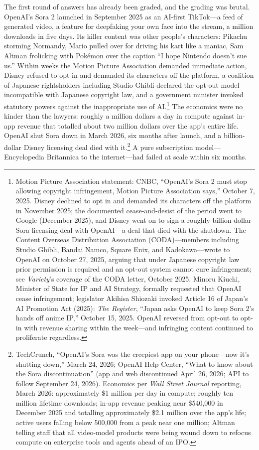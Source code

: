 The first round of answers has already been graded, and the grading was brutal. OpenAI's Sora 2 launched in September 2025 as an AI-first TikTok---a feed of generated video, a feature for deepfaking your own face into the stream, a million downloads in five days. Its killer content was other people's characters: Pikachu storming Normandy, Mario pulled over for driving his kart like a maniac, Sam Altman frolicking with Pok\'emon over the caption ``I hope Nintendo doesn't sue us.'' Within weeks the Motion Picture Association demanded immediate action, Disney refused to opt in and demanded its characters off the platform, a coalition of Japanese rightsholders including Studio Ghibli declared the opt-out model incompatible with Japanese copyright law, and a government minister invoked statutory powers against the inappropriate use of AI.\footnote{Motion Picture Association statement: CNBC, ``OpenAI's Sora 2 must stop allowing copyright infringement, Motion Picture Association says,'' October 7, 2025. Disney declined to opt in and demanded its characters off the platform in November 2025; the documented cease-and-desist of the period went to Google (December 2025), and Disney went on to sign a roughly billion-dollar Sora licensing deal with OpenAI---a deal that died with the shutdown. The Content Overseas Distribution Association (CODA)---members including Studio Ghibli, Bandai Namco, Square Enix, and Kadokawa---wrote to OpenAI on October 27, 2025, arguing that under Japanese copyright law prior permission is required and an opt-out system cannot cure infringement; see \emph{Variety}'s coverage of the CODA letter, October 2025. Minoru Kiuchi, Minister of State for IP and AI Strategy, formally requested that OpenAI cease infringement; legislator Akihisa Shiozaki invoked Article 16 of Japan's AI Promotion Act (2025): \emph{The Register}, ``Japan asks OpenAI to keep Sora 2's hands off anime IP,'' October 15, 2025. OpenAI reversed from opt-out to opt-in with revenue sharing within the week---and infringing content continued to proliferate regardless.} The economics were no kinder than the lawyers: roughly a million dollars a day in compute against in-app revenue that totalled about two million dollars over the app's entire life. OpenAI shut Sora down in March 2026, six months after launch, and a billion-dollar Disney licensing deal died with it.\footnote{TechCrunch, ``OpenAI's Sora was the creepiest app on your phone---now it's shutting down,'' March 24, 2026; OpenAI Help Center, ``What to know about the Sora discontinuation'' (app and web discontinued April 26, 2026; API to follow September 24, 2026). Economics per \emph{Wall Street Journal} reporting, March 2026: approximately \$1 million per day in compute; roughly ten million lifetime downloads; in-app revenue peaking near \$540,000 in December 2025 and totalling approximately \$2.1 million over the app's life; active users falling below 500,000 from a peak near one million; Altman telling staff that all video-model products were being wound down to refocus compute on enterprise tools and agents ahead of an IPO.} A pure subscription model---Encyclopedia Britannica to the internet---had failed at scale within six months.

